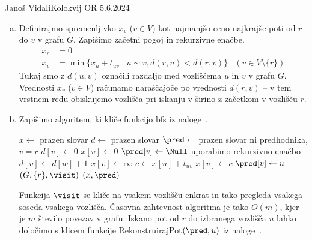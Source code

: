 \begin{naloga}{Janoš Vidali}{Kolokvij OR 5.6.2024}
\begin{odgovor}
\begin{enumerate}[(a)]
\item Definirajmo spremenljivko $x_v$ ($v \in V$)
kot najmanjšo ceno najkrajše poti od $r$ do $v$ v grafu $G$.
Zapišimo začetni pogoj in rekurzivne enačbe.
\begin{align*}
x_r &= 0 \\
x_v &= \min\{x_u + t_{uv} \mid u \sim v, d(r, u) < d(r, v)\} & (v \in V \setminus \{r\})
\end{align*}
Tukaj smo z $d(u, v)$ označili razdaljo med vozliščema $u$ in $v$ v grafu $G$.
Vred\-no\-sti $x_v$ ($v \in V$) računamo naraščajoče po vrednosti $d(r, v)$
-- v tem vrstnem redu obiskujemo vozlišča pri iskanju v širino
z začetkom v vozlišču $r$.

\item Zapišimo algoritem, ki kliče funkcijo {\sc bfs} iz naloge~\res[bfs].
\begin{small}
\begin{algorithmic}
	\State $x \gets$ prazen slovar
	\State $d \gets$ prazen slovar
	\State $\pred \gets$ prazen slovar
		 \hfill ni predhodnika, $v = r$
			\State $d[v] \gets 0$
			\State $x[v] \gets 0$
			\State $\pred[v] \gets \Null$
		\Else \hfill uporabimo rekurzivno enačbo
			\State $d[v] \gets d[w] + 1$
			\State $x[v] \gets \infty$
					\State $c \gets x[u] + t_{uv}$
						\State $x[v] \gets c$
						\State $\pred[v] \gets u$
					\EndIf
				\EndIf
			\EndFor
		\EndIf
	\EndFunction
	$(G, \{r\}, \visit)$
	\State \Return $(x, \pred)$
\EndFunction
\end{algorithmic}
\end{small}
Funkcija $\visit$ se kliče na vsakem vozlišču enkrat
in tako pregleda vsakega soseda vsakega vozlišča.
Časovna zahtevnost algoritma je tako $O(m)$,
kjer je $m$ število povezav v grafu.
Iskano pot od $r$ do izbranega vozlišča $u$
lahko določimo s klicem funkcije {\sc RekonstruirajPot}$(\pred, u)$
iz naloge~\res[topo].


\end{enumerate}
\end{odgovor}
\end{naloga}
